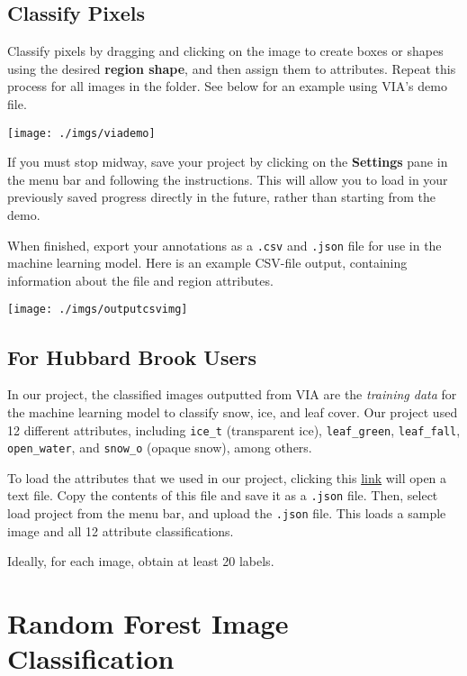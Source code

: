 \documentclass[
]{article}
\begin{document}
\hypertarget{classify-pixels}{%
\subsection{Classify Pixels}\label{classify-pixels}}

Classify pixels by dragging and clicking on the image to create boxes or shapes
using the desired \textbf{region shape}, and then assign them to attributes.
Repeat this process for all images in the folder. See below for an example using VIA's demo file.

\texttt{[image: ./imgs/viademo]}

If you must stop midway, save your project by clicking on the \textbf{Settings} pane
in the menu bar and following the instructions. This will allow you to load in
your previously saved progress directly in the future, rather than starting from the
demo.

When finished, export your annotations as a \texttt{.csv} and \texttt{.json} file for use in the machine learning model. Here is an example CSV-file output, containing information about the file and
region attributes.

\texttt{[image: ./imgs/outputcsvimg]}

\hypertarget{for-hubbard-brook-users}{%
\subsection{For Hubbard Brook Users}\label{for-hubbard-brook-users}}

In our project, the classified images outputted from VIA are the \emph{training data} for the machine learning model to classify snow, ice, and leaf cover. Our project used 12 different attributes,
including \texttt{ice\_t} (transparent ice), \texttt{leaf\_green}, \texttt{leaf\_fall}, \texttt{open\_water}, and
\texttt{snow\_o} (opaque snow), among others.

To load the attributes that we used in our project, clicking this \href{./imgs/hbwater_cameratrap_demo.json}{link} will open a text file. Copy the contents
of this file and save it as a \texttt{.json} file. Then, select load project from the menu bar,
and upload the \texttt{.json} file. This loads a sample image and all 12 attribute classifications.

Ideally, for each image, obtain at least 20 labels.

\hypertarget{random-forest-image-classification}{%
\section{Random Forest Image Classification}\label{random-forest-image-classification}}
\end{document}
